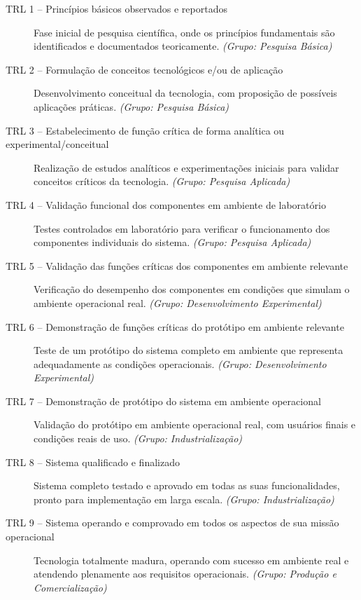 \begin{description}
   \item[TRL 1 -- Princípios básicos observados e reportados] Fase inicial de pesquisa científica, onde os princípios fundamentais são identificados e documentados teoricamente. \textit{(Grupo: Pesquisa Básica)}
    
   \item[TRL 2 -- Formulação de conceitos tecnológicos e/ou de aplicação] Desenvolvimento conceitual da tecnologia, com proposição de possíveis aplicações práticas. \textit{(Grupo: Pesquisa Básica)}
    
   \item[TRL 3 -- Estabelecimento de função crítica de forma analítica ou experimental/conceitual] Realização de estudos analíticos e experimentações iniciais para validar conceitos críticos da tecnologia. \textit{(Grupo: Pesquisa Aplicada)}
    
   \item[TRL 4 -- Validação funcional dos componentes em ambiente de laboratório] Testes controlados em laboratório para verificar o funcionamento dos componentes individuais do sistema. \textit{(Grupo: Pesquisa Aplicada)}
    
   \item[TRL 5 -- Validação das funções críticas dos componentes em ambiente relevante] Verificação do desempenho dos componentes em condições que simulam o ambiente operacional real. \textit{(Grupo: Desenvolvimento Experimental)}
    
   \item[TRL 6 -- Demonstração de funções críticas do protótipo em ambiente relevante] Teste de um protótipo do sistema completo em ambiente que representa adequadamente as condições operacionais. \textit{(Grupo: Desenvolvimento Experimental)}
    
   \item[TRL 7 -- Demonstração de protótipo do sistema em ambiente operacional] Validação do protótipo em ambiente operacional real, com usuários finais e condições reais de uso. \textit{(Grupo: Industrialização)}
    
    \item[TRL 8 -- Sistema qualificado e finalizado] Sistema completo testado e aprovado em todas as suas funcionalidades, pronto para implementação em larga escala. \textit{(Grupo: Industrialização)}
    
   \item[TRL 9 -- Sistema operando e comprovado em todos os aspectos de sua missão operacional] Tecnologia totalmente madura, operando com sucesso em ambiente real e atendendo plenamente aos requisitos operacionais. \textit{(Grupo: Produção e Comercialização)}
\end{description}

